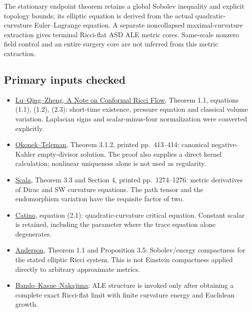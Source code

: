 \documentclass[
  10pt,
]{article}
\providecommand{\tightlist}{%
  \setlength{\itemsep}{0pt}\setlength{\parskip}{0pt}}
\begin{document}
The stationary endpoint theorem retains a global Sobolev inequality and
explicit topology bounds; its elliptic equation is derived from the
actual quadratic-curvature Euler--Lagrange equation. A separate
noncollapsed maximal-curvature extraction gives terminal Ricci-flat ASD
ALE metric cores. Same-scale nonzero field control and an entire surgery
core are not inferred from this metric extraction.

\hypertarget{primary-inputs-checked}{%
\subsection{Primary inputs checked}\label{primary-inputs-checked}}

\begin{itemize}
\tightlist
\item
  \href{https://arxiv.org/pdf/1109.5377}{Lu--Qing--Zheng, A Note on
  Conformal Ricci Flow}, Theorem 1.1, equations (1.1), (1.2), (2.3):
  short-time existence, pressure equation and classical volume
  variation. Laplacian signs and scalar-minus-four normalization were
  converted explicitly.
\item
  \href{https://library.slmath.org/books/Book37/files/okonek.pdf}{Okonek--Teleman},
  Theorem 3.1.2, printed pp.~413--414: canonical negative-Kahler
  empty-divisor solution. The proof also supplies a direct kernel
  calculation; nonlinear uniqueness alone is not used as regularity.
\item
  \href{https://www.numdam.org/item/10.5802/aif.2640.pdf}{Scala},
  Theorem 3.3 and Section 4, printed pp.~1274--1276: metric derivatives
  of Dirac and SW curvature equations. The path tensor and the
  endomorphism variation have the requisite factor of two.
\item
  \href{https://arxiv.org/pdf/1404.0569}{Catino}, equation (2.1):
  quadratic-curvature critical equation. Constant scalar is retained,
  including the parameter where the trace equation alone degenerates.
\item
  \href{https://arxiv.org/pdf/math/0312111}{Anderson}, Theorem 1.1 and
  Proposition 3.5: Sobolev/energy compactness for the stated elliptic
  Ricci system. This is not Einstein compactness applied directly to
  arbitrary approximate metrics.
\item
  \href{https://doi.org/10.1007/BF01389045}{Bando--Kasue--Nakajima}: ALE
  structure is invoked only after obtaining a complete exact Ricci-flat
  limit with finite curvature energy and Euclidean growth.
\end{itemize}
\end{document}
